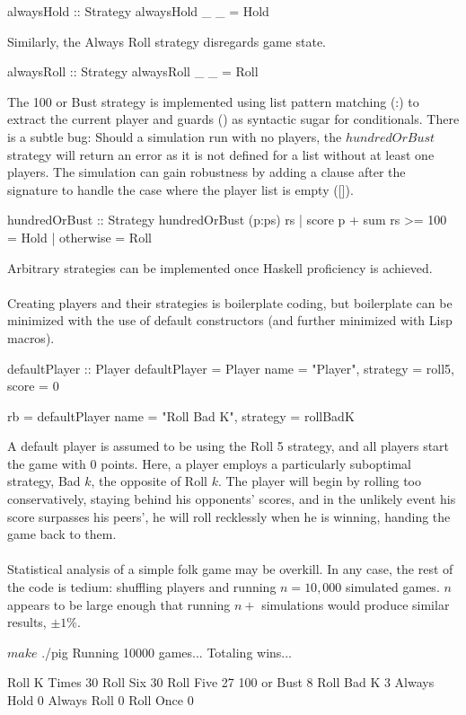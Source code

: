 \documentclass{article}
\begin{document}
\begin{verbatimtab}
alwaysHold :: Strategy
alwaysHold _ _ = Hold
\end{verbatimtab}
Similarly, the Always Roll strategy disregards game state.
\begin{verbatimtab}
alwaysRoll :: Strategy
alwaysRoll _ _ = Roll
\end{verbatimtab}
The 100 or Bust strategy is implemented using list pattern matching (:) to extract the current player and guards (\textbar) as syntactic sugar for conditionals. There is a subtle bug: Should a simulation run with no players, the $hundredOrBust$ strategy will return an error as it is not defined for a list without at least one players. The simulation can gain robustness by adding a clause after the signature to handle the case where the player list is empty ([]).
\begin{verbatimtab}
hundredOrBust :: Strategy
hundredOrBust (p:ps) rs
  | score p + sum rs >= 100 = Hold
  | otherwise = Roll
\end{verbatimtab}
Arbitrary strategies can be implemented once Haskell proficiency is achieved.
\\\\
Creating players and their strategies is boilerplate coding, but boilerplate can be minimized with the use of default constructors (and further minimized with Lisp macros).
\begin{verbatimtab}
defaultPlayer :: Player
defaultPlayer = Player {
  name = "Player",
  strategy = roll5,
  score = 0
  }

rb = defaultPlayer { name = "Roll Bad K", strategy = rollBadK }
\end{verbatimtab}
A default player is assumed to be using the Roll 5 strategy, and all players start the game with 0 points. Here, a player employs a particularly suboptimal strategy, Bad $k$, the opposite of Roll $k$. The player will begin by rolling too conservatively, staying behind his opponents' scores, and in the unlikely event his score surpasses his peers', he will roll recklessly when he is winning, handing the game back to them.
\\\\
Statistical analysis of a simple folk game may be overkill. In any case, the rest of the code is tedium: shuffling players and running $n = 10,000$ simulated games. $n$ appears to be large enough that running $n+$ simulations would produce similar results, $\pm 1\%$.
\begin{verbatimtab}
$ make
$ ./pig
Running 10000 games...
Totaling wins...

Roll K Times  30%
Roll Six  30%
Roll Five 27%
100 or Bust 8%
Roll Bad K  3%
Always Hold 0%
Always Roll 0%
Roll Once 0%
\end{verbatimtab}
\end{document}
